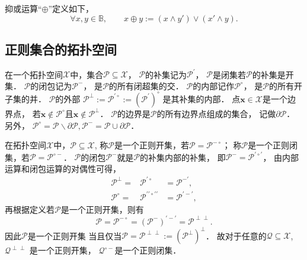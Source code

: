 抑或运算“$\oplus$”定义如下，
 \begin{equation}
\label{eq:symmetricDifference}
\forall x,y\in {\mathbb B},\qquad 
x \oplus y := (x \wedge y') \vee (x' \wedge y).
\end{equation}

\subsection{正则集合的拓扑空间}
在一个拓扑空间$\mathcal{X}$中，集合$\mathcal{P}\subseteq\mathcal{X}$，
$\mathcal{P}$的补集记为$\mathcal{P}^{\prime}$，
 $\mathcal{P}$是闭集若$\mathcal{P}$的补集是开集．
 $\mathcal{P}$的闭包记为$\mathcal{P}^-$，
 是$\mathcal{P}$的所有闭超集的交．
 $\mathcal{P}$的内部记作$\mathcal{P}^{\circ}$，
 是$\mathcal{P}$的所有开子集的并．
 $\mathcal{P}$的外部
 $\mathcal{P}^{\perp} :=\mathcal{P}^{\prime \circ} :=(\mathcal{P}^{\prime}) ^{\circ}$
 是其补集的内部．
 点$\mathbf{x}\in \mathcal{X}$是一个边界点，
 若$\mathbf{x}\notin \mathcal{P}^{\circ}$且$\mathbf{x}\notin \mathcal{P}^{\perp}$．
 $\mathcal{P}$的边界是$\mathcal{P}$的所有边界点组成的集合，
 记做$\partial \mathcal{P}$．
 另外，
 $\mathcal{P}^{\circ}=\mathcal{P} \backslash \partial \mathcal{P},　 \mathcal{P}^- =\mathcal{P} \cup \partial \mathcal{P}$．


在拓扑空间$\mathcal{X}$中，$\mathcal{P}\subseteq \mathcal{X}$,
称$\mathcal{P}$是一个正则开集，若$\mathcal{P}=\mathcal{P}^{- \circ}$；
称$\mathcal{P}$是一个正则闭集，若$\mathcal{P}=\mathcal{P}^{\circ -}$．
$\mathcal{P}$的闭包$\mathcal{P}^-$就是$\mathcal{P}$的补集内部的补集\cite{ginzburg01:_two_vof}，
即$\mathcal{P}^-=\mathcal{P}^{\prime \circ \prime}$，
由内部运算和闭包运算的对偶性可得，
\begin{equation*}
\begin{array}{rcl}
\mathcal{P}^{\perp}=&\mathcal{P}^{\prime\circ}&=\mathcal{P}^{- \prime},\\
\mathcal{P}^{\circ}=&\mathcal{P}^{\prime \prime \circ \prime\prime}&=\mathcal{P}^{\prime -\prime},
\end{array}
\end{equation*}
再根据定义若$\mathcal{P}$是一个正则开集，则有
\begin{equation*}
\mathcal{P}=\mathcal{P}^{-\circ}=(\mathcal{P}^-)^{\prime -\prime}=\mathcal{P}^{\perp\perp}.
\end{equation*}
因此$\mathcal{P}$是一个正则开集
当且仅当$\mathcal{P}=\mathcal{P}^{\perp \perp} :=(\mathcal{P}^{\perp})^{\perp}$．
故对于任意的$\mathcal{Q}\subseteq \mathcal{X}$, $\mathcal{Q}^{\perp \perp}$ 是一个正则开集，
$\mathcal{Q}^{\circ -}$是一个正则闭集．

